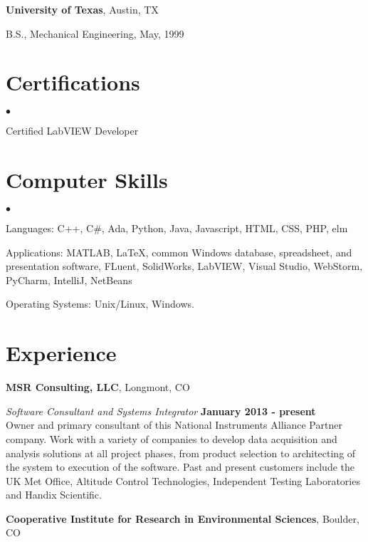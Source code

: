 \documentclass[margin,line]{res}
\newenvironment{list1}{
  \begin{list}{\ding{113}}{%
      \setlength{\itemsep}{0in}
      \setlength{\parsep}{0in} \setlength{\parskip}{0in}
      \setlength{\topsep}{0in} \setlength{\partopsep}{0in} 
      \setlength{\leftmargin}{0.17in}}}{\end{list}}
\newenvironment{list2}{
  \begin{list}{$\bullet$}{%
      \setlength{\itemsep}{0in}
      \setlength{\parsep}{0in} \setlength{\parskip}{0in}
      \setlength{\topsep}{0in} \setlength{\partopsep}{0in} 
      \setlength{\leftmargin}{0.2in}}}{\end{list}}
\begin{document}
\begin{resume}
{\bf University of Texas}, Austin, TX\\
\vspace*{-.1in}
\begin{list1}
\item[] B.S., Mechanical Engineering,  May, 1999
\end{list1}

\section{\sc Certifications}
\begin{list2}
\item Certified LabVIEW Developer
\end{list2}

\section{\sc Computer Skills} 
\begin{list2}
\item Languages:  C++, C\#, Ada, Python, Java, Javascript, HTML, CSS, PHP, elm
\item Applications: MATLAB, \LaTeX, common Windows
  database, spreadsheet, and presentation software, FLuent, SolidWorks, LabVIEW, Visual Studio, WebStorm, PyCharm, IntelliJ, NetBeans
\item Operating Systems:  Unix/Linux, Windows.\\ 
\end{list2}

\section{\sc Experience}
{\bf MSR Consulting, LLC}, Longmont, CO

\vspace{-.3cm}
{\em Software Consultant and Systems Integrator} \hfill {\bf January 2013 - present}\\
Owner and primary consultant of this National Instruments Alliance Partner company.  Work with a variety of companies to develop data acquisition and analysis solutions at all project phases, from product selection to architecting of the system to execution of the software.  Past and present customers include the UK Met Office, Altitude Control Technologies, Independent Testing Laboratories and Handix Scientific.  


{\bf Cooperative Institute for Research in Environmental Sciences}, Boulder, CO


\end{resume}
\end{document}
